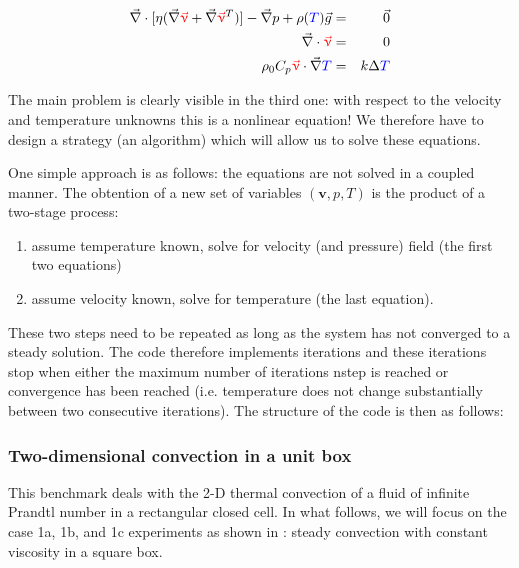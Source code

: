 \begin{eqnarray}
{\vec \nabla}\cdot [\eta ({\vec\nabla} {\color{red}{\vec \upnu}} 
+ {\vec \nabla} {\color{red}{\vec \upnu}}^T ) ] 
- {\vec \nabla}p + \rho({\color{blue}T}) {\vec g} &=& {\vec 0}   \\
{\vec \nabla}\cdot {\color{red} {\vec \upnu}} &=& 0 \\
\rho_0 C_p {\color{red} {\vec \upnu}}\cdot {\vec \nabla} {\color{blue}T} &=& k \Delta {\color{blue}T} 
\end{eqnarray} 

The main problem is clearly visible in the third one: with respect to the velocity and 
temperature unknowns this is a nonlinear equation! 
We therefore have to design a strategy (an algorithm) which will allow us to solve these 
equations. 

One simple approach is as follows: the equations are not solved in a coupled manner. 
The obtention of a new set of variables $({\bm v},p,T)$ is the product of a two-stage process:
\begin{enumerate}
\item assume temperature known, solve for velocity (and pressure) field (the first two equations)
\item assume velocity known, solve for temperature (the last equation).
\end{enumerate}

These two steps need to be repeated as long as the system has not converged to a steady solution. 
The code therefore implements iterations and these iterations stop when either the maximum number 
of iterations nstep is reached or convergence has been reached (i.e. temperature does not change 
substantially between two consecutive iterations). The structure of the code 
is then as follows:






\subsubsection{Two-dimensional convection in a unit box}

This benchmark deals with the 2-D thermal convection of a fluid 
of infinite Prandtl number in a rectangular closed cell.
In what follows, we will focus on the case 1a, 1b, and 1c experiments as shown in \cite{blbc89}:
steady convection with constant viscosity in a square box.

